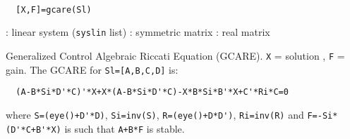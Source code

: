 \begin{mandesc}
   \\ %
\end{mandesc}
\begin{calling_sequence}
\begin{verbatim}
  [X,F]=gcare(Sl)  
\end{verbatim}
\end{calling_sequence}
\begin{parameters}
  \begin{varlist}
    : linear system (\verb!syslin! list)
    : symmetric matrix
    : real matrix
  \end{varlist}
\end{parameters}
\begin{mandescription}
  Generalized Control Algebraic Riccati Equation (GCARE).
  \verb!X! = solution , \verb!F! = gain.
  The GCARE for \verb!Sl=[A,B,C,D]! is:
\begin{verbatim}
  (A-B*Si*D'*C)'*X+X*(A-B*Si*D'*C)-X*B*Si*B'*X+C'*Ri*C=0
\end{verbatim}
  where \verb!S=(eye()+D'*D)!, \verb!Si=inv(S)!, \verb!R=(eye()+D*D')!, \verb!Ri=inv(R)! 
  and \verb!F=-Si*(D'*C+B'*X)! is such that \verb!A+B*F! is stable.
\end{mandescription}
\begin{manseealso}
\end{manseealso}
